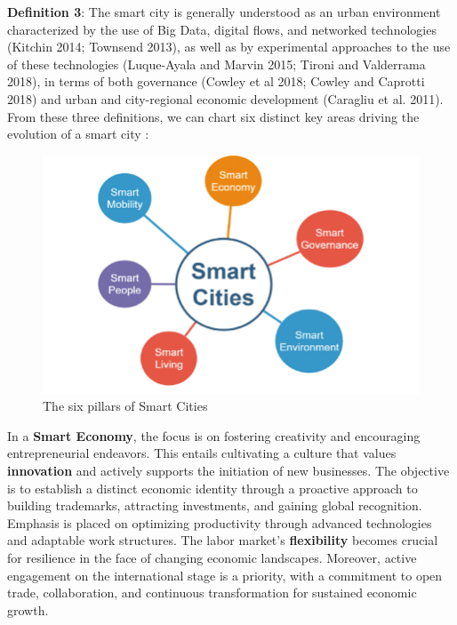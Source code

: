 \textbf{Definition 3}: The smart city is generally understood as an urban environment characterized by the use of Big Data, digital flows, and networked technologies (Kitchin 2014; Townsend 2013), as well as by experimental approaches to the use of these technologies (Luque-Ayala and Marvin 2015; Tironi and Valderrama 2018), in terms of both governance (Cowley et al 2018; Cowley and Caprotti 2018) and urban and city-regional economic development (Caragliu et al. 2011).
\\

From these three definitions, we can chart six distinct key areas driving the evolution of a smart city \cite{foo2}:

\begin{figure}
\centering
\includegraphics[width=0.7\columnwidth]{images/The-six-pillars-of-Smart-Cities-based-on-8.png}
\caption{The six pillars of Smart Cities \cite{foo3}}
\end{figure}


    

    
 
In a \textbf{Smart Economy}, the focus is on fostering creativity and encouraging entrepreneurial endeavors. This entails cultivating a culture that values \textbf{innovation} and actively supports the initiation of new businesses. The objective is to establish a distinct economic identity through a proactive approach to building trademarks, attracting investments, and gaining global recognition.
Emphasis is placed on optimizing productivity through advanced technologies and adaptable work structures. The labor market's \textbf{flexibility} becomes crucial for resilience in the face of changing economic landscapes. Moreover, active engagement on the international stage is a priority, with a commitment to open trade, collaboration, and continuous transformation for sustained economic growth.

